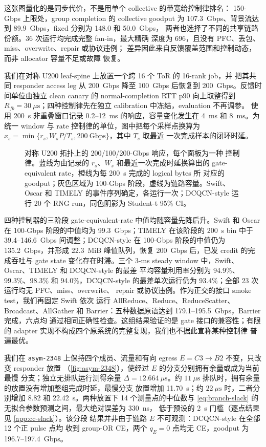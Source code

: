这张图量化的是同步代价，不是用单个 collective 的带宽给控制律排名：
150-Gbps 上限处，group completion 的 collective goodput 为
107.3~Gbps、背景流达到 89.9~Gbps，fixed 分别为 148.0 和 50.0~Gbps，
两者也选择了不同的共享链路份额。36 次运行均完成完整 fan-in，最大精确
深度为 696，且没有 PFC、丢包、miss、overwrite、repair 或协议违例；
差异因此来自反馈覆盖范围和控制动态，而非 allocator 容量不足或故障
恢复。

我们在对称 U200 leaf-spine 上放置一个跨 16 个 ToR 的 16-rank job，并
把其共同 responder access leg 从 200~Gbps 降至 100~Gbps 后恢复到
200~Gbps。反馈时间单位由独立 clean canary 的 normal-completion RTT
p90 向上取整得到 $R_{fb}=30~\mu\mathrm{s}$；四种控制律先在独立
calibration 中冻结，evaluation 不再调参。 使用
200~\textmu s 非重叠窗口记录 0.2--12~ms 的响应，容量变化发生在 4~ms
和 8~ms。为统一 window 与 rate 控制律的单位，图中把每个采样点换算为
$\hat{x}_s=\min\{r_s,W_sP/T_s,200~\mathrm{Gbps}\}$，其中 $T_s$ 取最近
一次完成样本的闭环时延。

\begin{figure}[t]
\centering

\caption{对称 U200 拓扑上的 200/100/200-Gbps 响应，每个面板为一种
控制律。蓝线为由记录的 $r_s$、$W_s$ 和最近一次完成时延换算出的
gate-equivalent rate，橙线为每 200~\textmu s 完成的 logical bytes 所
对应的 goodput；灰色区域为 100-Gbps 阶段，虚线为链路容量。Swift、
Oscar 和 TIMELY 的事件序列确定，各运行一次；DCQCN-style 运行 20 个
RNG run，同色阴影为 Student-t 95\% CI。}
\label{fig:cc-gate}
\end{figure}

四种控制器的三阶段 gate-equivalent-rate 中值均随容量先降后升。Swift
和 Oscar 在 100-Gbps 阶段的中值均为 99.3~Gbps；TIMELY 在该阶段的
200~\textmu s bin 中于 39.4--146.6~Gbps 间调整；DCQCN-style 在
100-Gbps 阶段的中值仍为 135.2~Gbps，并形成 22.3~MiB 峰值队列，恢复
200~Gbps 后，已发 credit 的完成吞吐与 gate state 变化存在时滞。三个
3-ms steady window 中，Swift、Oscar、TIMELY 和 DCQCN-style 的最差
平均容量利用率分别为 94.9\%、99.3\%、98.3\% 和 94.0\%，DCQCN-style
的最差单次运行仍为 93.4\%；全部 23 次运行均无 PFC、miss、overwrite、
repair 或协议违例。作为正交的接口 smoke test，我们再固定 Swift 依次
运行 AllReduce、Reduce、ReduceScatter、Broadcast、AllGather 和
Barrier：五种数据原语达到 179.1--195.5~Gbps，Barrier 完成，六点均
通过相同正确性检查。这组结果验证的是 gate 接口的兼容性；有限的
adapter 实现不构成四个原系统的完整复现，我们也不据此宣称某种控制律
普遍最优。

我们在 \texttt{asym-2348} 上保持四个成员、流量和有向 egress
$E=C3\rightarrow B2$ 不变，只改变 responder 放置
（\cref{fig:asym-2348}），使经过 $E$ 的分支分别拥有余量或成为当前最慢
分支；独立无排队运行测得余量 $\Delta=12.664~\mu\mathrm{s}$。约
$11~\mu\mathrm{s}$ 排队时，拥有余量的放置没有增加整组完成时延，最慢分支
放置增加 11.70~\textmu s；约 $22~\mu\mathrm{s}$ 时，二者分别增加 8.82 和
22.42~\textmu s。两种放置下 14 个测量点的中位数与
\cref{eq:branch-slack} 的无拟合参数预测之间，最大绝对误差为 330~ns，
低于预设的 2~\textmu s 门槛（逐点结果见 \cref{app:cc-slack}）。该分段
结果并非由于链路 $E$ 不可观测：DCQCN-style 在全部 12 个正 pulse 点均
收到 group-OR CE，两个 $q_E=0$ 点均无 CE，goodput 为
196.7--197.4~Gbps。

